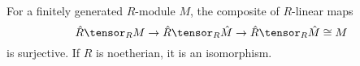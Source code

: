 For a finitely generated $R$-module $M$, the composite of $R$-linear maps
\[ \hat{R}\tensor_R M\to \hat{R}\tensor_{R} \hat{M}\to \hat{R}\tensor_{R} \hat{M} \cong M \]
is surjective. If $R$ is noetherian, it is an isomorphism.
